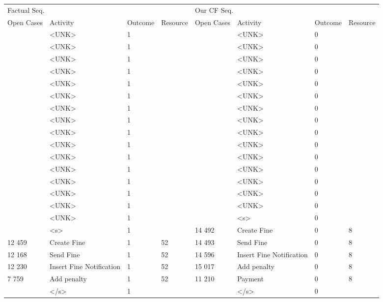 \begin{tabular}{llllllll}
\toprule
\multicolumn{4}{l}{Factual Seq.} & \multicolumn{4}{l}{Our CF Seq.} \\
Open Cases & Activity & Outcome & Resource & Open Cases & Activity & Outcome & Resource \\
\midrule
 & <UNK> & 1 &  &  & <UNK> & 0 &  \\
 & <UNK> & 1 &  &  & <UNK> & 0 &  \\
 & <UNK> & 1 &  &  & <UNK> & 0 &  \\
 & <UNK> & 1 &  &  & <UNK> & 0 &  \\
 & <UNK> & 1 &  &  & <UNK> & 0 &  \\
 & <UNK> & 1 &  &  & <UNK> & 0 &  \\
 & <UNK> & 1 &  &  & <UNK> & 0 &  \\
 & <UNK> & 1 &  &  & <UNK> & 0 &  \\
 & <UNK> & 1 &  &  & <UNK> & 0 &  \\
 & <UNK> & 1 &  &  & <UNK> & 0 &  \\
 & <UNK> & 1 &  &  & <UNK> & 0 &  \\
 & <UNK> & 1 &  &  & <UNK> & 0 &  \\
 & <UNK> & 1 &  &  & <UNK> & 0 &  \\
 & <UNK> & 1 &  &  & <UNK> & 0 &  \\
 & <UNK> & 1 &  &  & <UNK> & 0 &  \\
 & <UNK> & 1 &  &  & <s> & 0 &  \\
 & <s> & 1 &  & 14 492 & Create Fine & 0 & 8 \\
12 459 & Create Fine & 1 & 52 & 14 493 & Send Fine & 0 & 8 \\
12 168 & Send Fine & 1 & 52 & 14 596 & Insert Fine Notification & 0 & 8 \\
12 230 & Insert Fine Notification & 1 & 52 & 15 017 & Add penalty & 0 & 8 \\
7 759 & Add penalty & 1 & 52 & 11 210 & Payment & 0 & 8 \\
 & </s> & 1 &  &  & </s> & 0 &  \\
\bottomrule
\end{tabular}
